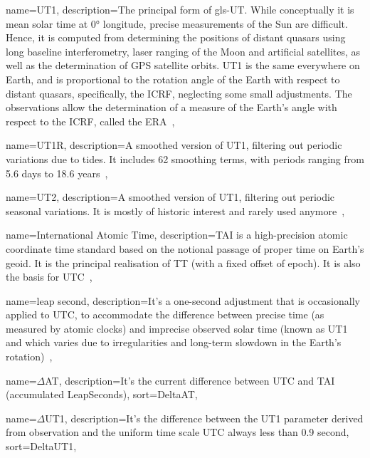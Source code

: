 {
	name={UT1},
	description={The principal form of \gls{gls-UT}. While conceptually it is mean solar time at 0° longitude, precise measurements of the Sun are difficult. Hence, it is computed from determining the positions of distant quasars using long baseline interferometry, laser ranging of the Moon and artificial satellites, as well as the determination of GPS satellite orbits. UT1 is the same everywhere on Earth, and is proportional to the rotation angle of the Earth with respect to distant quasars, specifically, the \gls{ICRF}, neglecting some small adjustments. The observations allow the determination of a measure of the Earth's angle with respect to the \gls{ICRF}, called the \gls{ERA}~\cite{UniversalTime2020}},
}

 {
	name={UT1R},
	description={A smoothed version of \gls{UT1}, filtering out periodic variations due to tides. It includes 62 smoothing terms, with periods ranging from 5.6 days to 18.6 years~\cite{UniversalTime2020}},
}

 {
	name={UT2},
	description={A smoothed version of \gls{UT1}, filtering out periodic seasonal variations. It is mostly of historic interest and rarely used anymore~\cite{UniversalTime2020}},
}

 {
	name={International Atomic Time},
	description={\acrshort{TAI} is a high-precision atomic coordinate time standard based on the notional passage of proper time on Earth's geoid. It is the principal realisation of \gls{TT} (with a fixed offset of epoch). It is also the basis for \gls{UTC}~\cite{InternationalAtomicTime2020}},
}

 {
	name={leap second},
	description={It's a one-second adjustment that is occasionally applied to \gls{UTC}, to accommodate the difference between precise time (as measured by atomic clocks) and imprecise observed solar time (known as \gls{UT1} and which varies due to irregularities and long-term slowdown in the Earth's rotation)~\cite{LeapSecond2021}},
}

 {
	name={\ensuremath{\Delta}AT},
	description={It's the current difference between \gls{UTC} and \gls{TAI} (accumulated \glspl{LeapSecond})},
	sort={DeltaAT},
}

 {
	name={\ensuremath{\Delta}UT1},
	description={It's the difference between the \gls{UT1} parameter derived from observation and the uniform time
scale \gls{UTC} always less than 0.9 second},
	sort={DeltaUT1},
}

